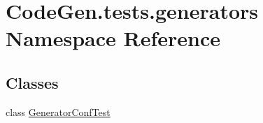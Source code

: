 \hypertarget{namespaceCodeGen_1_1tests_1_1generators}{}\section{Code\+Gen.\+tests.\+generators Namespace Reference}
\label{namespaceCodeGen_1_1tests_1_1generators}
\subsection*{Classes}
\begin{DoxyCompactItemize}
\item 
class \mbox{\hyperlink{classCodeGen_1_1tests_1_1generators_1_1GeneratorConfTest}{Generator\+Conf\+Test}}
\end{DoxyCompactItemize}
